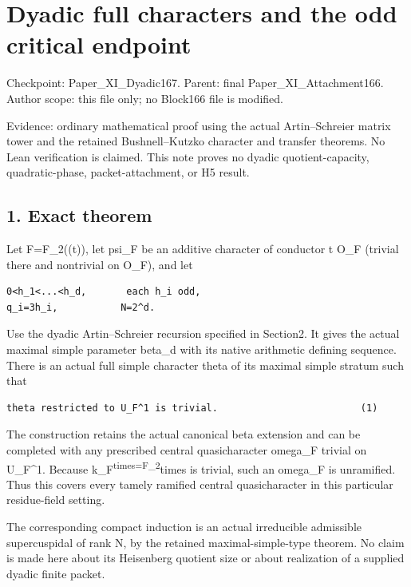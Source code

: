\clearpage
\section{Dyadic full characters and the odd critical endpoint}\label{app:dyadic_character}

Checkpoint: Paper\_XI\_Dyadic167. Parent: final
Paper\_XI\_Attachment166. Author scope: this file only; no Block166 file
is modified.

Evidence: ordinary mathematical proof using the actual Artin--Schreier
matrix tower and the retained Bushnell--Kutzko character and transfer
theorems. No Lean verification is claimed. This note proves no dyadic
quotient-capacity, quadratic-phase, packet-attachment, or H5 result.

\hypertarget{dyadic_character-exact-theorem}{%
\subsection{1. Exact theorem}\label{dyadic_character-exact-theorem}}

Let F=F\_2((t)), let psi\_F be an additive character of conductor t O\_F
(trivial there and nontrivial on O\_F), and let

\begin{Verbatim}[fontsize=\small,breaklines=true,breakanywhere=true]
0<h_1<...<h_d,       each h_i odd,
q_i=3h_i,           N=2^d.
\end{Verbatim}

Use the dyadic Artin--Schreier recursion specified in Section2. It gives
the actual maximal simple parameter beta\_d with its native arithmetic
defining sequence. There is an actual full simple character theta of its
maximal simple stratum such that

\begin{Verbatim}[fontsize=\small,breaklines=true,breakanywhere=true]
theta restricted to U_F^1 is trivial.                         (1)
\end{Verbatim}

The construction retains the actual canonical beta extension and can be
completed with any prescribed central quasicharacter omega\_F trivial on
U\_F\^{}1. Because k\_F\textsuperscript{times=F\_2}times is trivial,
such an omega\_F is unramified. Thus this covers every tamely ramified
central quasicharacter in this particular residue-field setting.

The corresponding compact induction is an actual irreducible admissible
supercuspidal of rank N, by the retained maximal-simple-type theorem. No
claim is made here about its Heisenberg quotient size or about
realization of a supplied dyadic finite packet.

